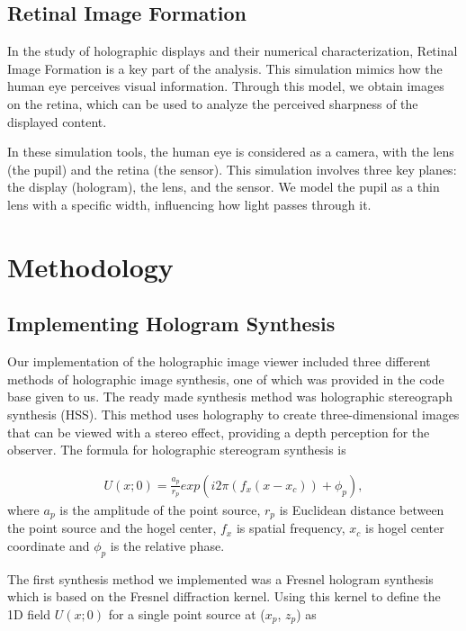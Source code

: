 \documentclass[12pt,a4paper,english
]{tunithesis}
\begin{document}
\section{Retinal Image Formation}
In the study of holographic displays and their numerical characterization, Retinal Image Formation is a key part of the analysis. This simulation mimics how the human eye perceives visual information. Through this model, we obtain images on the retina, which can be used to analyze the perceived sharpness of the displayed content.

In these simulation tools, the human eye is considered as a camera, with the lens (the pupil) and the retina (the sensor). This simulation involves three key planes: the display (hologram), the lens, and the sensor. We model the pupil as a thin lens with a specific width, influencing how light passes through it.



\chapter{Methodology}
\label{sec:methodology}

\section{Implementing Hologram Synthesis}
Our implementation of the holographic image viewer included three different methods of holographic image synthesis, one of which was provided in the code base given to us. The ready made synthesis method was holographic stereograph synthesis (HSS). This method uses holography to create three-dimensional images that can be viewed with a stereo effect, providing a depth perception for the observer. The formula for holographic stereogram synthesis is 

\begin{align}
  \label{eq:hss}
  U(x;0) = \frac{a_p}{r_p}exp(i 2\pi(f_x(x-x_c))+\phi_p),
\end{align}
where $a_p$ is the amplitude of the point source, $r_p$ is Euclidean distance between the point source and the hogel center, $f_x$ is spatial frequency, $x_c$ is hogel center coordinate and $\phi_p$ is the relative phase.


The first synthesis method we implemented was a Fresnel hologram synthesis which is based on the Fresnel diffraction kernel. Using this kernel to define the 1D field $U(x;0)$ for a single point source at  ($x_p$, $z_p$) as
\end{document}

